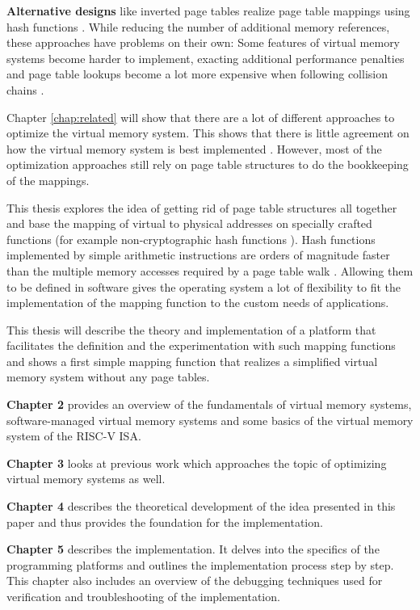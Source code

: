 \textbf{Alternative designs} like inverted page tables realize page table mappings using hash functions \cite{tanenbaumOS}. While reducing the number of additional memory references, these approaches have problems on their own: Some features of virtual memory systems become harder to implement, exacting additional performance penalties \cite{yaniv2016hash} and page table lookups become a lot more expensive when following collision chains \cite{jacob1998look}.

Chapter \ref{chap:related} will show that there are a lot of different approaches to optimize the virtual memory system.
This shows that there is little agreement on how the virtual memory system is best implemented \cite{jacob1998look}.
However, most of the optimization approaches still rely on page table structures to do the bookkeeping of the mappings.

This thesis explores the idea of getting rid of page table structures all together and base the mapping of virtual to physical addresses on specially crafted functions (for example non-cryptographic hash functions \cite{mittelbach2021non}).
Hash functions implemented by simple arithmetic instructions are orders of magnitude faster than the multiple memory accesses required by a page table walk \cite{tanenbaumOS}. Allowing them to be defined in software gives the operating system a lot of flexibility to fit the implementation of the mapping function to the custom needs of applications.

This thesis will describe the theory and implementation of a platform that facilitates the definition and the experimentation with such mapping functions and shows a first simple mapping function that realizes a simplified virtual memory system without any page tables.


\textbf{Chapter 2} provides an overview of the fundamentals of virtual memory systems, software-managed virtual memory systems and some basics of the virtual memory system of the RISC-V ISA.

\textbf{Chapter 3} looks at previous work which approaches the topic of optimizing virtual memory systems as well.

\textbf{Chapter 4} describes the theoretical development of the idea presented in this paper and thus provides the foundation for the implementation.

\textbf{Chapter 5} describes the implementation. It delves into the specifics of the programming platforms and outlines the implementation process step by step. This chapter also includes an overview of the debugging techniques used for verification and troubleshooting of the implementation.

